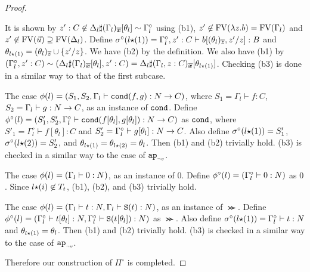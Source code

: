 \begin{proof}
\begin{itemize}
    It is shown by
    $z':C \not\in \Delta_l\sharp(\Gamma_l)_{\overline{\boldsymbol{x}}}[\theta_l] \sim \Gamma^\circ_l$
    using (b1), 
    $z'\not\in {{\rm FV}}(\lambda z.b) = {{\rm FV}}(\Gamma_l)$ and $z' \not\in{{\rm FV}}(\vec{u}) \supseteq {{\rm FV}}(\Delta_l)$. 
    Define $\sigma^\circ(l{\star}(1)) = \Gamma^\circ_l,z':C\vdash b[(\theta_l)_{\overline{z}},z'/z]:B$
    and $\theta_{l{\star}(1)} = (\theta_l)_{\overline{z}}\cup\{z'/z\}$.
    We have (b2) by the definition. 
    We also have (b1) by $(\Gamma^\circ_l,z':C) \sim (\Delta_l\sharp(\Gamma_l)_{\overline{\boldsymbol{x}}}[\theta_l],z':C) = \Delta_l\sharp(\Gamma_l,z:C)_{\overline{\boldsymbol{x}}}[\theta_{l{\star}(1)}]$.
    Checking (b3) is done in a similar way to that of the first subcase.
  \end{itemize}

  The case $\phi(l) = (S_1,S_2,\Gamma_l\vdash {\tt cond}(f,g):{N}\to C)$, where
  $S_1 = \Gamma_l\vdash f:C$, $S_2 = \Gamma_l\vdash g:{N}\to C$, as an instance of ${\tt cond}$. 
  Define $\phi^\circ(l) = (S'_1,S'_2,\Gamma^\circ_l\vdash {\tt cond}(f[\theta_l],g[\theta_l]):{N}\to C)$ as ${\tt cond}$,
  where $S'_1 = \Gamma^\circ_l \vdash f[\theta_l]:C$ and $S'_2 = \Gamma^\circ_l \vdash g[\theta_l]:{N}\to C$.
  Also define $\sigma^\circ(l{\star}(1)) = S'_1$, $\sigma^\circ(l{\star}(2))  = S'_2$,
  and $\theta_{l{\star}(1)} = \theta_{l{\star}(2)} = \theta_l$. 
  Then (b1) and (b2) trivially hold.
  (b3) is checked in a similar way to the case of ${{\tt ap}_{\mbox{\tiny $\neg v$}}}$.

  The case $\phi(l) = (\Gamma_l\vdash 0:{N})$, as an instance of $0$. 
  Define $\phi^\circ(l) = (\Gamma^\circ_l\vdash 0:{N})$ as $0$. 
  Since $l{\star}(i)\not\in T_t$, (b1), (b2), and (b3) trivially hold.
  
  The case $\phi(l) = (\Gamma_l\vdash t:{N}, \Gamma_l\vdash {\tt S}(t):{N})$, as an instance of $\Succ$. 
  Define
  $\phi^\circ(l) = (\Gamma^\circ_l\vdash t[\theta_l]:{N}, \Gamma^\circ_l\vdash {\tt S}(t[\theta_l]):{N})$ as $\Succ$. 
  Also define $\sigma^\circ(l{\star}(1)) = \Gamma^\circ_l\vdash t:{N}$
  and $\theta_{l{\star}(1)} = \theta_l$.
  Then (b1) and (b2) trivially hold.
  (b3) is checked in a similar way to the case of ${{\tt ap}_{\mbox{\tiny $\neg v$}}}$.

  Therefore our construction of $\Pi^\circ$ is completed.
\end{proof}

